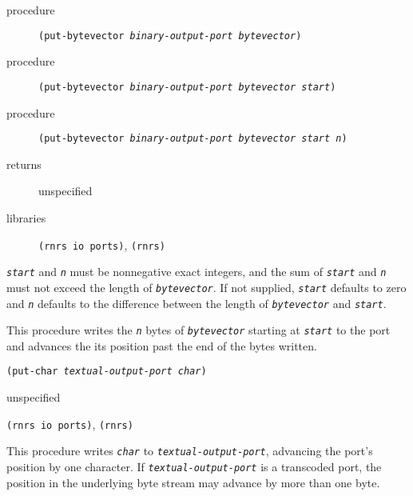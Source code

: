\begin{description}

\label{io_s70}\item[procedure] \texttt{(put-bytevector \textit{binary-output-port} \textit{bytevector})}



\item[procedure] \texttt{(put-bytevector \textit{binary-output-port} \textit{bytevector} \textit{start})}



\item[procedure] \texttt{(put-bytevector \textit{binary-output-port} \textit{bytevector} \textit{start} \textit{n})}



\item[returns] unspecified


\item[libraries] \texttt{(rnrs io ports)}, \texttt{(rnrs)}
\end{description}

\texttt{\textit{start}} and \texttt{\textit{n}} must be nonnegative exact integers, and the sum of
\texttt{\textit{start}} and \texttt{\textit{n}} must not exceed the length of \texttt{\textit{bytevector}}.
If not supplied, \texttt{\textit{start}} defaults to zero and \texttt{\textit{n}} defaults to
the difference between the length of \texttt{\textit{bytevector}} and \texttt{\textit{start}}.

This procedure writes the \texttt{\textit{n}} bytes of \texttt{\textit{bytevector}} starting at
\texttt{\textit{start}} to the port and advances the its position
past the end of the bytes written.


\begin{description}

\label{io_s71}\item[procedure] \texttt{(put-char \textit{textual-output-port} \textit{char})}



\item[returns] unspecified


\item[libraries] \texttt{(rnrs io ports)}, \texttt{(rnrs)}
\end{description}


This procedure writes \texttt{\textit{char}} to \texttt{\textit{textual-output-port}}, advancing
the port's position by one character.
If \texttt{\textit{textual-output-port}} is a transcoded port, the position in the
underlying byte stream may advance by more than one byte.


